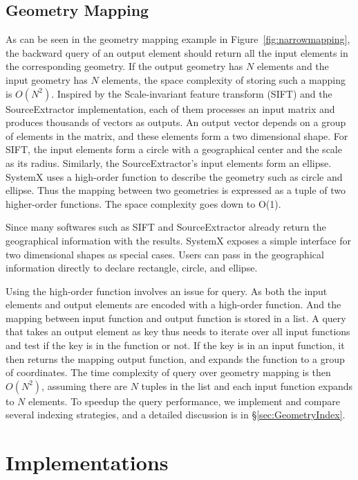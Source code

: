\documentclass{sig-alternate}
\begin{document}
\subsection{Geometry Mapping}
\label{sec:Design-GeometryMapping}
As can be seen in the geometry mapping example in Figure~\ref{fig:narrowmapping}, the backward query of an output element should return all the input elements in the corresponding geometry. If the output geometry has $N$ elements and the input geometry has $N$ elements, the space complexity of storing such a mapping is $O(N^2)$. 
Inspired by the Scale-invariant feature transform (SIFT) and the SourceExtractor implementation, each of them processes an input matrix and produces thousands of vectors as outputs. An output vector depends on a group of elements in the matrix, and these elements form a two dimensional shape. 
For SIFT, the input elements form a circle with a geographical center and the scale as its radius.
Similarly, the SourceExtractor's input elements form an ellipse. 
SystemX uses a high-order function to describe the geometry such as circle and ellipse. 
Thus the mapping between two geometries is expressed as a tuple of two higher-order functions.
The space complexity goes down to O(1).

Since many softwares such as SIFT and SourceExtractor already return the geographical information with the results.
SystemX exposes a simple interface for two dimensional shapes as special cases.
Users can pass in the geographical information directly to declare rectangle, circle, and ellipse.

Using the high-order function involves an issue for query. 
As both the input elements and output elements are encoded with a high-order function. 
And the mapping between input function and output function is stored in a list. 
A query that takes an output element as key thus needs to iterate over all input functions and test if the key is in the function or not.
If the key is in an input function, it then returns the mapping output function, and expands the function to a group of coordinates.
The time complexity of query over geometry mapping is then $O(N^2)$, assuming there are $N$ tuples in the list and each input function expands to $N$ elements.
To speedup the query performance, we implement and compare several indexing strategies, and a detailed discussion is in \S\ref{sec:GeometryIndex}.


\section{Implementations}
\label{sec:Impl}
\end{document}
